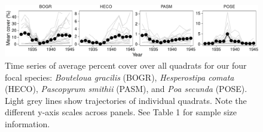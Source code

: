 \documentclass[12pt,]{article}
\begin{document}
\begin{figure}[htbp]
\centering
\includegraphics{components/figure/manuscript-figure_1-1.pdf}
\caption{Time series of average percent cover over all quadrats for our
four focal species: \emph{Bouteloua gracilis} (BOGR), \emph{Hesperostipa
comata} (HECO), \emph{Pascopyrum smithii} (PASM), and \emph{Poa secunda}
(POSE). Light grey lines show trajectories of individual quadrats. Note
the different y-axis scales across panels. See Table 1 for sample size
information.}
\end{figure}

\newpage{}
\end{document}
